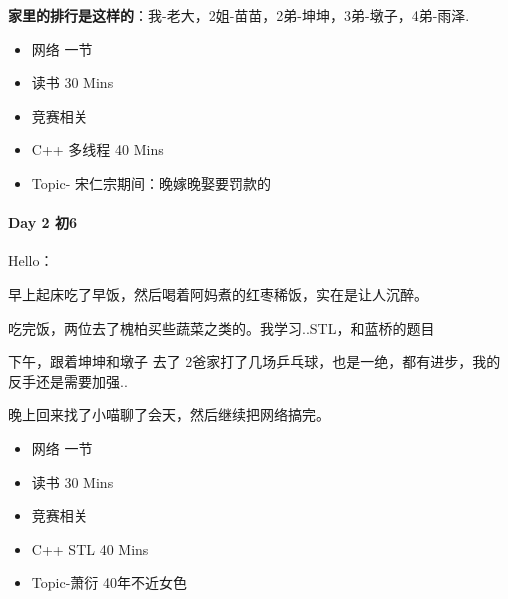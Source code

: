 \documentclass[UTF8,a4paper,8pt]{ctexart}
\begin{document}
	 	 \textbf{家里的排行是这样的}：我-老大，2姐-苗苗，2弟-坤坤，3弟-墩子，4弟-雨泽.
	 	 \begin{itemize}
	 	 	\item  \makebox[0pt][l]{$\square$}\raisebox{.15ex}{\hspace{0.1em}$\checkmark$} 网络  一节
	 	 	
	 	 	\item   读书  30 Mins		 	 
	 	 	\item  \makebox[0pt][l]{$\square$}\raisebox{.15ex}{\hspace{0.1em}$\checkmark$} 竞赛相关
	 	 	\item  \makebox[0pt][l]{$\square$}\raisebox{.15ex}{\hspace{0.1em}$\checkmark$} C++ 多线程  40 Mins
	 	 	
	 	 	\item  \makebox[0pt][l]{$\square$}\raisebox{.15ex}{\hspace{0.1em}$\checkmark$} Topic- 宋仁宗期间：晚嫁晚娶要罚款的
	 	 \end{itemize} 
 	 \paragraph{Day 2   初6    \quad     }
	 	 Hello：
	 	 
	 	 早上起床吃了早饭，然后喝着阿妈煮的红枣稀饭，实在是让人沉醉。
	 	 
	 	 吃完饭，两位去了槐柏买些蔬菜之类的。我学习..STL，和蓝桥的题目
	 	 
	 	 下午，跟着坤坤和墩子 去了 2爸家打了几场乒乓球，也是一绝，都有进步，我的反手还是需要加强..
	 	 
	 	 晚上回来找了小喵聊了会天，然后继续把网络搞完。
	 	 \begin{itemize}
	 	 	\item  \makebox[0pt][l]{$\square$}\raisebox{.15ex}{\hspace{0.1em}$\checkmark$} 网络  一节
	 	 	
	 	 	\item   读书  30 Mins		 	 
	 	 	\item  \makebox[0pt][l]{$\square$}\raisebox{.15ex}{\hspace{0.1em}$\checkmark$} 竞赛相关
	 	 	\item  \makebox[0pt][l]{$\square$}\raisebox{.15ex}{\hspace{0.1em}$\checkmark$} C++ STL  40 Mins
	 	 	
	 	 	\item  \makebox[0pt][l]{$\square$}\raisebox{.15ex}{\hspace{0.1em}$\checkmark$} Topic-萧衍 40年不近女色
	 	 \end{itemize}
\end{document}
